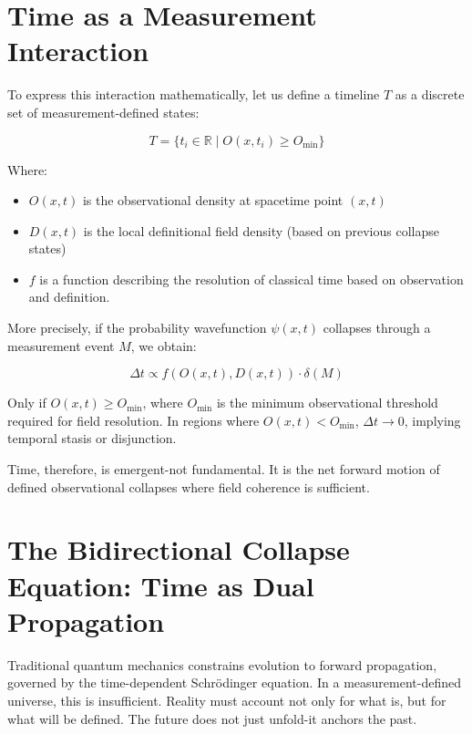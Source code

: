 \section{Time as a Measurement Interaction}

To express this interaction mathematically, let us define a timeline $T$ as a discrete set of measurement-defined states:

\begin{equation}
T = \{ t_i \in \mathbb{R} \mid O(x,t_i) \geq O_{\text{min}} \}
\end{equation}

Where:
\begin{itemize}
\item $O(x,t)$ is the observational density at spacetime point $(x,t)$
\item $D(x,t)$ is the local definitional field density (based on previous collapse states)
\item $f$ is a function describing the resolution of classical time based on observation and definition.
\end{itemize}

More precisely, if the probability wavefunction $\psi(x,t)$ collapses through a measurement event $M$, we obtain:

\begin{equation}
\Delta t \propto f(O(x,t), D(x,t)) \cdot \delta(M)
\end{equation}

Only if $O(x,t) \geq O_{\text{min}}$, where $O_{\text{min}}$ is the minimum observational threshold required for field resolution. In regions where $O(x,t) < O_{\text{min}}$, $\Delta t \rightarrow 0$, implying temporal stasis or disjunction.

Time, therefore, is emergent-not fundamental. It is the net forward motion of defined observational collapses where field coherence is sufficient.

\section{The Bidirectional Collapse Equation: Time as Dual Propagation}

Traditional quantum mechanics constrains evolution to forward propagation, governed by the time-dependent Schrödinger equation. In a measurement-defined universe, this is insufficient. Reality must account not only for what is, but for what will be defined. The future does not just unfold-it anchors the past.

